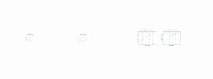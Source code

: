 \begin{figure}[p]
\begin{tabular}{ccc}
        \includegraphics[height=36mm,width=0.24\textwidth]{Images/simulation_no_obs/coverage_plots/11.png}
        & \includegraphics[height=36mm,width=0.24\textwidth]{Images/simulation_no_obs/coverage_plots/12.png}
        & \includegraphics[height=36mm,width=0.24\textwidth]{Images/simulation_no_obs/coverage_plots/13.png}
        \includegraphics[height=36mm,width=0.24\textwidth]{Images/simulation_no_obs/coverage_plots/14.png}\\[-4pt]


\end{tabular}
\end{figure}

